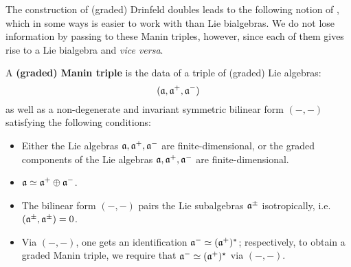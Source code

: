         The construction of (graded) Drinfeld doubles leads to the following notion of , which in some ways is easier to work with than Lie bialgebras. We do not lose information by passing to these Manin triples, however, since each of them gives rise to a Lie bialgebra and \textit{vice versa}.
        \begin{definition} \label{def: manin_triples}
            A \textbf{(graded) Manin triple} is the data of a triple of (graded) Lie algebras:
                $$(\mathfrak{a}, \mathfrak{a}^+, \mathfrak{a}^-)$$
            as well as a non-degenerate and invariant symmetric bilinear form $(-, -)$ satisfying the following conditions:
            \begin{itemize}
                \item Either the Lie algebras $\mathfrak{a}, \mathfrak{a}^+, \mathfrak{a}^-$ are finite-dimensional, or the graded components of the Lie algebras $\mathfrak{a}, \mathfrak{a}^+, \mathfrak{a}^-$ are finite-dimensional.
                \item $\mathfrak{a} \simeq \mathfrak{a}^+ \oplus \mathfrak{a}^-$.
                \item The bilinear form $(-, -)$ pairs the Lie subalgebras $\mathfrak{a}^{\pm}$ isotropically, i.e. $(\mathfrak{a}^{\pm}, \mathfrak{a}^{\pm}) = 0$. 
                \item Via $(-, -)$, one gets an identification $\mathfrak{a}^- \simeq (\mathfrak{a}^+)^*$; respectively, to obtain a graded Manin triple, we require that $\mathfrak{a}^- \simeq (\mathfrak{a}^+)^{\star}$ via $(-, -)$.
            \end{itemize}
        \end{definition}
